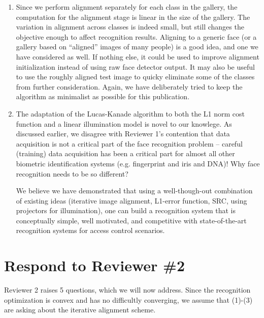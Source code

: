 \documentclass[11pt]{article}
\begin{document}
\begin{enumerate}
\item Since we perform alignment separately for each class in the gallery, the
computation for the alignment stage is linear in the size of the gallery.  The
variation in alignment across classes is indeed small, but still changes the
objective enough to affect recognition results.  Aligning to a generic face (or
a gallery based on ``aligned'' images of many people) is a good idea, and one
we have considered as well.  If nothing else, it could be used to improve
alignment initialization instead of using raw face detector output.  It may
also be useful to use the roughly aligned test image to quicky eliminate some
of the classes from further consideration.  Again, we have deliberately tried
to keep the algorithm as minimalist as possible for this publication.

\item The adaptation of the Lucas-Kanade algorithm to both the L1 norm cost
function and a linear illumination model is novel to our knowlege.  As
discussed earlier, we disagree with Reviewer 1's contention that data
acquisition is not a critical part of the face recognition problem -- careful (training) 
data acquisition has been a critical part for almost all other biometric identification 
systems (e.g. fingerprint and iris and DNA)! Why face recognition needs to be so different? 

We believe we have demonstrated that using a well-though-out combination of existing ideas
(iterative image alignment, L1-error function, SRC, using projectors for
illumination), one can build a recognition system that is conceptually simple, well
motivated, and competitive with state-of-the-art recognition systems for access
control scenarios.

\end{enumerate}

\section{Respond to Reviewer \#2}
Reviewer 2 raises 5 questions, which we will now address.  Since the
recognition optimization is convex and has no difficultly converging, we assume
that (1)-(3) are asking about the iterative alignment scheme.
\end{document}
